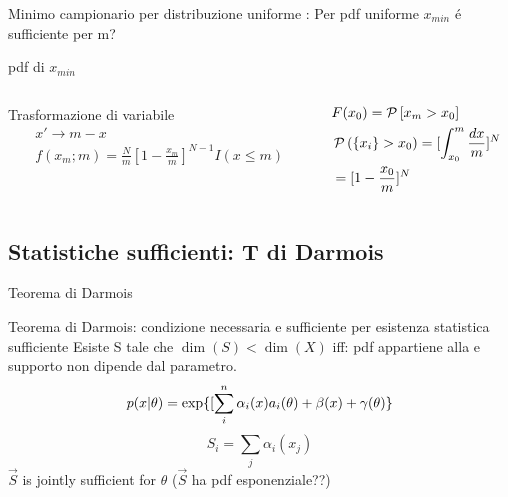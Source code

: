 \documentclass[asd-beamer.tex]{subfiles}%
\begin{document}
\begin{wordonframe}{Minimo campionario per distribuzione uniforme}
: Per pdf uniforme $x_{min}$ \'e sufficiente per m?
\end{wordonframe}

\begin{wordonframe}{}
pdf di $x_{min}$
\begin{columns}[T]
\begin{column}{0.5\textwidth}
Trasformazione di variabile
\begin{align*}
&x'\to m-x\\
&f(x_m;m)=\frac{N}{m}[1-\frac{x_m}{m}]^{N-1}I(x\leq m)
\end{align*}
\end{column}
\begin{column}{0.5\textwidth}
\begin{align*}
&F(x_0)=\operatorname{\mathcal{P}}{[x_m>x_0]}\\
&\operatorname{\mathcal{P}}{(\{x_i\}>x_0)}=[\int_{x_0}^m\frac{dx}{m}]^N\\
&=[1-\frac{x_0}{m}]^N
\end{align*}
\end{column}
\end{columns}
\end{wordonframe}

\subsection{Statistiche sufficienti: T di Darmois}

\begin{frame}{Teorema di Darmois}\frameintoc
\begin{block}{Teorema di Darmois: condizione necessaria e sufficiente per esistenza statistica sufficiente}
Esiste S tale che $\dim{(S)}<\dim{(X)}$ iff: pdf appartiene alla  e supporto non dipende dal parametro.
\begin{equation*}
p(x|\theta)=\text{exp}\{[\sum_i^n\alpha_i(x)a_i(\theta)+\beta(x)+\gamma(\theta)\}
\end{equation*}
\begin{equation*}
S_i=\sum_j\alpha_i(x_j)
\end{equation*}
$\vec{S}$ is jointly sufficient for $\theta$ ($\vec{S}$ ha pdf esponenziale??)
\end{block}
\end{frame}
\end{document}
